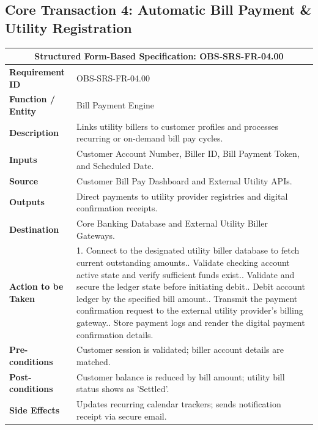 \documentclass[11pt,a4paper]{article}
\begin{document}
\newpage

\subsection{Core Transaction 4: Automatic Bill Payment \& Utility Registration}
\begin{center}
\small
\singlespacing
\begin{tabular}{p{4.0cm} p{11.0cm}}
\toprule
\multicolumn{2}{c}{\textbf{Structured Form-Based Specification: OBS-SRS-FR-04.00}} \\ \midrule
\textbf{Requirement ID} & OBS-SRS-FR-04.00 \\ \midrule
\textbf{Function / Entity} & Bill Payment Engine \\ \midrule
\textbf{Description} & Links utility billers to customer profiles and processes recurring or on-demand bill pay cycles. \\ \midrule
\textbf{Inputs} & Customer Account Number, Biller ID, Bill Payment Token, and Scheduled Date. \\ \midrule
\textbf{Source} & Customer Bill Pay Dashboard and External Utility APIs. \\ \midrule
\textbf{Outputs} & Direct payments to utility provider registries and digital confirmation receipts. \\ \midrule
\textbf{Destination} & Core Banking Database and External Utility Biller Gateways. \\ \midrule
\textbf{Action to be Taken} & 
1. Connect to the designated utility biller database to fetch current outstanding amounts.\newline
2. Validate checking account active state and verify sufficient funds exist.\newline
3. Validate and secure the ledger state before initiating debit.\newline
4. Debit account ledger by the specified bill amount.\newline
5. Transmit the payment confirmation request to the external utility provider's billing gateway.\newline
6. Store payment logs and render the digital payment confirmation details. \\ \midrule
\textbf{Pre-conditions} & Customer session is validated; biller account details are matched. \\ \midrule
\textbf{Post-conditions} & Customer balance is reduced by bill amount; utility bill status shows as 'Settled'. \\ \midrule
\textbf{Side Effects} & Updates recurring calendar trackers; sends notification receipt via secure email. \\ \bottomrule
\end{tabular}
\end{center}
\end{document}
